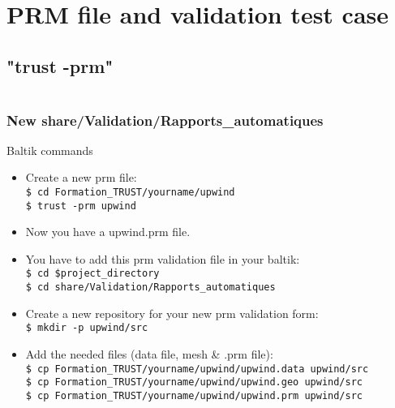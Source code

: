 \documentclass[10pt, hyperref={unicode=true,pdfusetitle, bookmarks=true,bookmarksnumbered=false,bookmarksopen=false, breaklinks=false,pdfborder={0 0 1},backref=true,colorlinks=true,linkcolor=darkblue,pageanchor, urlcolor=darkblue}]{beamer}
\begin{document}
\section{{\bf{PRM file and validation test case}}}
\subsection{{\bf{"trust -prm"}}}
\begin{frame}
\begin{columns}[c] 
\tableofcontents[sections={1-4},currentsection, currentsubsection]
\tableofcontents[sections={5-8},currentsection, currentsubsection]
\end{columns}
\end{frame}
\begin{frame}
\frametitle{New share/Validation/Rapports\_automatiques}
\begin{block}{Baltik commands}

\begin{itemize}
\item Create a new prm file:\\
\texttt{\$ cd Formation\_TRUST/yourname/upwind}\\
\texttt{\$ trust -prm upwind}
\item Now you have a upwind.prm file.

\item You have to add this prm validation file in your baltik:\\
\texttt{\$ cd \$project\_directory}\\
\texttt{\$ cd share/Validation/Rapports\_automatiques}

\item Create a new repository for your new prm validation form:\\
\texttt{\$ mkdir -p upwind/src}

\item Add the needed files (data file, mesh \& .prm file):\\
\texttt{\$ cp Formation\_TRUST/yourname/upwind/upwind.data upwind/src}\\
\texttt{\$ cp Formation\_TRUST/yourname/upwind/upwind.geo upwind/src}\\
\texttt{\$ cp Formation\_TRUST/yourname/upwind/upwind.prm upwind/src}
\end{itemize}

\end{block}
\end{frame}
\end{document}
